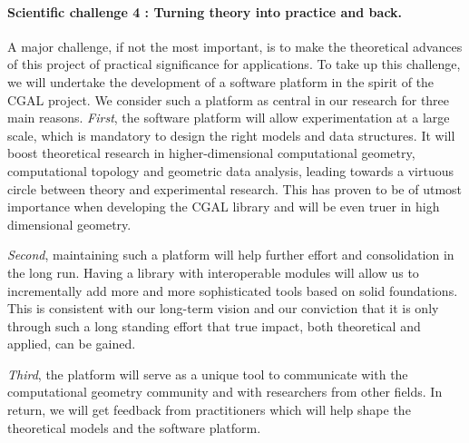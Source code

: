 \paragraph{Scientific challenge 4 : Turning theory into practice and back.}%
A major challenge, if not the most important, is to make the theoretical advances of this project of practical significance for applications.  To take up this challenge,
we will undertake the development of a software platform in the spirit of the CGAL project. We consider such a platform as central in our research  for three main reasons.  {\em First}, the software platform will allow experimentation at a large scale, which is mandatory to design the right models and data structures. It will boost theoretical research in higher-dimensional computational geometry, computational topology and geometric data analysis, leading towards a virtuous circle between theory and experimental research. This has proven to be of utmost importance when developing the CGAL library and will be even truer in high dimensional geometry.

{\em Second}, maintaining such a platform will help further effort and consolidation in the long run.  Having a library with interoperable modules will allow us to incrementally add more and more sophisticated tools based on solid foundations.  This is consistent with our long-term vision and our conviction that it is only through such a long standing effort that true impact, both theoretical and applied, can be gained.

{\em Third}, the platform will serve as a unique tool to communicate with the computational geometry community and with researchers from other fields. 
 In return, we will get feedback from practitioners which will help shape the theoretical models and the software platform.


 




